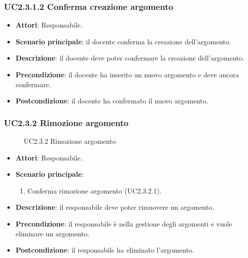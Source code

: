 \subsubsection{UC2.3.1.2 Conferma creazione argomento}
\begin{itemize}
\item \textbf{Attori}: Responsabile.
\item \textbf{Scenario principale}: il docente conferma la creazione dell'argomento.
\item \textbf{Descrizione}: il docente deve poter confermare la creazione dell'argomento.
\item \textbf{Precondizione}: il docente ha inserito un nuovo argomento e deve ancora confermare.
\item \textbf{Postcondizione}: il docente ha confermato il nuovo argomento.
\end{itemize}
\subsubsection{UC2.3.2 Rimozione argomento}
\begin{figure}[H]
\centering
\noindent{}
\caption{UC2.3.2 Rimozione argomento}
\end{figure}
\begin{itemize}
\item \textbf{Attori}: Responsabile.
\item \textbf{Scenario principale}:
\begin{enumerate}
\item Conferma rimozione argomento (UC2.3.2.1).
\end{enumerate}
\item \textbf{Descrizione}: il responsabile deve poter rimuovere un argomento.
\item \textbf{Precondizione}: il responsabile è nella gestione degli argomenti e vuole eliminare un argomento.
\item \textbf{Postcondizione}: il responsabile ha eliminato l'argomento.
\end{itemize}
